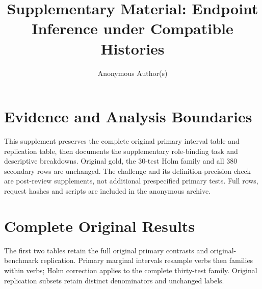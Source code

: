 \documentclass[acmlarge,anonymous,review,nonacm]{acmart}
\title{Supplementary Material: Endpoint Inference under Compatible Histories}
\author{Anonymous Author(s)}
\begin{document}
\maketitle
\section{Evidence and Analysis Boundaries}
This supplement preserves the complete original primary interval table and replication table, then documents the supplementary role-binding task and descriptive breakdowns. Original gold, the 30-test Holm family and all 380 secondary rows are unchanged. The challenge and its definition-precision check are post-review supplements, not additional prespecified primary tests. Full rows, request hashes and scripts are included in the anonymous archive.

\section{Complete Original Results}
The first two tables retain the full original primary contrasts and original-benchmark replication. Primary marginal intervals resample verbs then families within verbs; Holm correction applies to the complete thirty-test family. Original replication subsets retain distinct denominators and unchanged labels.
\end{document}
